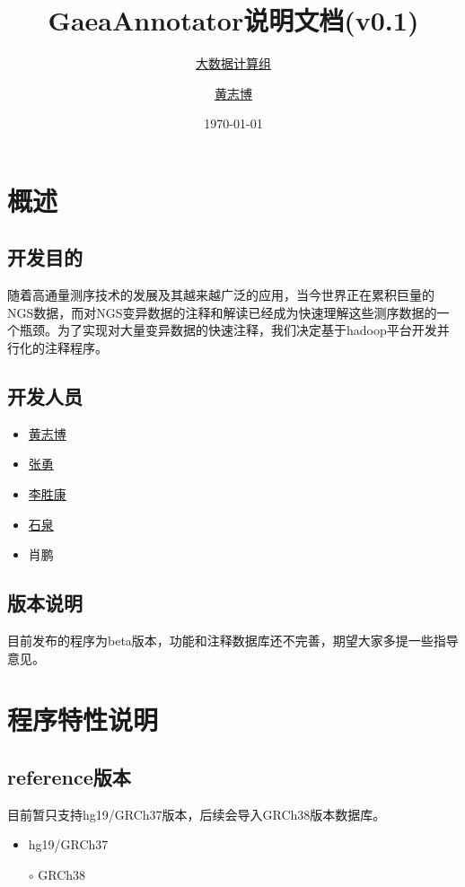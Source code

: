 \documentclass[UTF8,10pt,a4paper]{ctexart}
\title{GaeaAnnotator说明文档{\small (v0.1)}}
\author{\href{http://bigdata.genomics.cn/}{大数据计算组} \and
\href{mailto:huangzhibo@genomics.cn}{黄志博}}
\date{\today}
\begin{document}
\maketitle
\vspace{3em}
\tableofcontents\thispagestyle{empty}
\newpage
\setlength{\parskip}{1ex plus 0.5ex minus 0.2ex}



\section{概述}
\subsection{开发目的}
随着高通量测序技术的发展及其越来越广泛的应用，当今世界正在累积巨量的NGS数据，而对NGS变异数据的注释和解读已经成为快速理解这些测序数据的一个瓶颈。为了实现对大量变异数据的快速注释，我们决定基于hadoop平台开发并行化的注释程序。

\subsection{开发人员}
\begin{multicols}{5}
\begin{itemize}
\item \href{mailto:huangzhibo@genomics.cn} {黄志博 }
\item  \href{mailto:zhangyong2@genomics.cn}{张勇}
\item \href{mailto:lishengkang@genomics.cn}{李胜康}
\item \href{mailto:shiquan@genomics.cn}{石泉}
\item 肖鹏
\end{itemize}
\end{multicols}

\subsection{版本说明}
目前发布的程序为beta版本，功能和注释数据库还不完善，期望大家多提一些指导意见。

\section{程序特性说明}
\subsection{reference版本}
目前暂只支持hg19/GRCh37版本，后续会导入GRCh38版本数据库。
\begin{itemize}
	\item hg19/GRCh37
        \item[$\circ$] GRCh38
\end{itemize}
\end{document}
